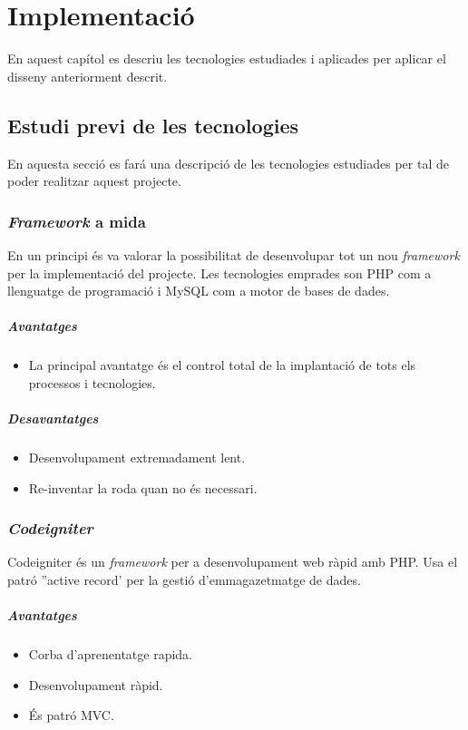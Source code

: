 \chapter{Implementaci\'{o}}
\label{cha:implementation}
En aquest capítol es descriu les tecnologies estudiades i aplicades per aplicar el disseny anteriorment descrit.


\section{Estudi previ de les tecnologies}
En aquesta secci\'{o} es far\'{a} una descripci\'{o} de les tecnologies estudiades per tal de poder realitzar aquest projecte. 

\subsection{\textit{Framework} a mida}
En un principi \'{e}s va valorar la possibilitat de desenvolupar tot un nou \textit{framework} per la implementaci\'{o} del projecte. Les tecnologies emprades son PHP com a llenguatge de programaci\'{o} i MySQL com a motor de bases de dades.
\paragraph{Avantatges}
\begin{itemize} 
\item La principal avantatge \'{e}s el control total de la implantaci\'{o} de tots els processos i tecnologies.
\end{itemize} 

\paragraph{Desavantatges}
\begin{itemize} 
\item Desenvolupament extremadament lent.
\item Re-inventar la roda quan no \'{e}s necessari.
\end{itemize} 

\subsection{\textit{Codeigniter}}
Codeigniter \'{e}s un \textit{framework} per a desenvolupament web r\`{a}pid amb PHP. Usa el patr\'{o} ''active record' per la gesti\'{o} d'emmagazetmatge de dades. 
\paragraph{Avantatges}
\begin{itemize}
\item Corba d'aprenentatge rapida.
\item Desenvolupament r\`{a}pid.
\item \'{E}s patr\'{o} MVC.
\end{itemize}

